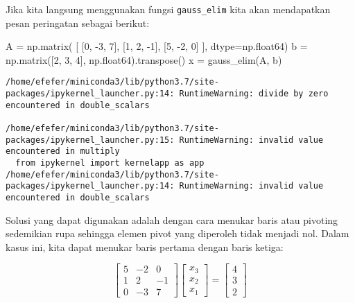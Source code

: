\documentclass[11pt]{article}
\newenvironment{Shaded}{}{}
\newcommand{\DecValTok}[1]{\textcolor[rgb]{0.25,0.63,0.44}{{#1}}}
\newcommand{\NormalTok}[1]{{#1}}
\newcommand{\OperatorTok}[1]{\textcolor[rgb]{0.40,0.40,0.40}{{#1}}}
\begin{document}
    Jika kita langsung menggunakan fungsi \texttt{gauss\_elim} kita akan
mendapatkan pesan peringatan sebagai berikut:

\begin{Shaded}
\begin{Highlighting}[]
\NormalTok{A }\OperatorTok{=}\NormalTok{ np.matrix( [}
\NormalTok{    [}\DecValTok{0}\NormalTok{, }\DecValTok{-3}\NormalTok{, }\DecValTok{7}\NormalTok{],}
\NormalTok{    [}\DecValTok{1}\NormalTok{, }\DecValTok{2}\NormalTok{, }\DecValTok{-1}\NormalTok{],}
\NormalTok{    [}\DecValTok{5}\NormalTok{, }\DecValTok{-2}\NormalTok{, }\DecValTok{0}\NormalTok{]}
\NormalTok{], dtype}\OperatorTok{=}\NormalTok{np.float64)}
\NormalTok{b }\OperatorTok{=}\NormalTok{ np.matrix([}\DecValTok{2}\NormalTok{, }\DecValTok{3}\NormalTok{, }\DecValTok{4}\NormalTok{], np.float64).transpose()}
\NormalTok{x }\OperatorTok{=}\NormalTok{ gauss_elim(A, b)}
\end{Highlighting}
\end{Shaded}

\begin{verbatim}
/home/efefer/miniconda3/lib/python3.7/site-packages/ipykernel_launcher.py:14: RuntimeWarning: divide by zero encountered in double_scalars
  
/home/efefer/miniconda3/lib/python3.7/site-packages/ipykernel_launcher.py:15: RuntimeWarning: invalid value encountered in multiply
  from ipykernel import kernelapp as app
/home/efefer/miniconda3/lib/python3.7/site-packages/ipykernel_launcher.py:14: RuntimeWarning: invalid value encountered in double_scalars
\end{verbatim}

    Solusi yang dapat digunakan adalah dengan cara menukar baris atau
pivoting sedemikian rupa sehingga elemen pivot yang diperoleh tidak
menjadi nol. Dalam kasus ini, kita dapat menukar baris pertama dengan
baris ketiga:

\[
\begin{bmatrix}
5 & -2 & 0 \\
1 & 2 & -1 \\
0 & -3 & 7
\end{bmatrix}
\begin{bmatrix}
x_3 \\
x_2 \\
x_1
\end{bmatrix}
= 
\begin{bmatrix}
4 \\
3 \\
2
\end{bmatrix}
\]
\end{document}
